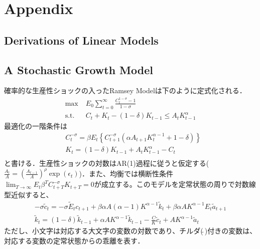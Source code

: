 \documentclass[a4j, dvipdfmx]{jarticle}
\begin{document}
\section{Appendix}
\begin{appendix}
\section{Derivations of Linear Models}
\subsection{A Stochastic Growth Model}
確率的な生産性ショックの入ったRamsey Modelは下のように定式化される．
\begin{align*}
\max & \; E_0 \sum_{t=0}^\infty \frac{C_t^{1-\sigma} - 1}{1-\sigma}\\
\text{s.t.} & \; C_t + K_t - (1-\delta) K_{t-1} \le A_t K_{t-1}^\alpha 
\end{align*}
最適化の一階条件は
\begin{align*}
&C_t^{-\sigma} = \beta E_t\left\{C_{t+1}^{-\sigma} (\alpha A_{t+1} K_t^{\alpha-1} + 1 -\delta)\right\}\\
&K_t = (1-\delta) K_{t-1} + A_t K_{t-1}^\alpha - C_t\\
\end{align*}
と書ける．生産性ショックの対数はAR(1)過程に従うと仮定する($\frac{A_t}{A} = \left(\frac{A_{t-1}}{A}\right)^\rho \exp(\epsilon_t)$)．また、均衡では横断性条件 $\lim_{T \to \infty} E_t \beta^T C_{t+T}^{-\sigma} K_{t+T} = 0$が成立する。このモデルを定常状態の周りで対数線型近似すると、
\begin{align*}
-\sigma \tilde c_t = -\sigma  \tilde E_tc_{t+1} + \beta \alpha A (\alpha -1) K^{\alpha -1} \tilde k_t + \beta \alpha A K^{\alpha -1} E_t\tilde a_{t+1}\\
\tilde k_t = (1-\delta) \tilde k_{t-1} + \alpha A K^{\alpha -1} \tilde k_{t-1} - \frac{C}{K} \tilde c_t + AK^{\alpha-1} \tilde a_t
\end{align*}
ただし、小文字は対応する大文字の変数の対数であり、チルダ($\tilde{~}$)付きの変数は、対応する変数の定常状態からの乖離を表す．


\end{appendix}
\end{document}
